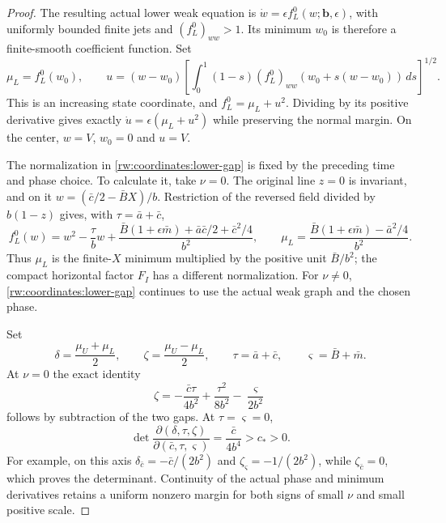 \begin{proof}
The resulting actual lower weak equation is
$\dot w=\epsilon f_L^0(w;\mathbf b,\epsilon)$, with uniformly
bounded finite jets and $(f_L^0)_{ww}>1$. Its minimum $w_0$ is
therefore a finite-smooth coefficient function. Set
\begin{equation}\label{rw:coordinates:lower-gap}
 \mu_L=f_L^0(w_0),\qquad
 u=(w-w_0)\left[\int_0^1(1-s)
    (f_L^0)_{ww}(w_0+s(w-w_0))\,ds\right]^{1/2}.
\end{equation}
This is an increasing state coordinate, and $f_L^0=\mu_L+u^2$.
Dividing by its positive derivative gives exactly
$\dot u=\epsilon(\mu_L+u^2)$ while preserving the normal margin.
On the center, $w=V$, $w_0=0$ and $u=V$.

The normalization in \eqref{rw:coordinates:lower-gap} is fixed by the
preceding time and phase choice. To calculate it, take $\nu=0$.
The original line $z=0$ is invariant, and on it
$w=(\bar c/2-\bar BX)/b$. Restriction of the reversed field divided
by $b(1-z)$ gives, with $\tau=\bar a+\bar c$,
\begin{equation}\label{rw:coordinates:lower-exact}
 f_L^0(w)=w^2-\frac{\tau}{b}w
  +\frac{\bar B(1+\epsilon\bar m)+\bar a\bar c/2+\bar c^2/4}{b^2},
 \qquad
 \mu_L=\frac{\bar B(1+\epsilon\bar m)-\bar a^2/4}{b^2}.
\end{equation}
Thus $\mu_L$ is the finite-$X$ minimum multiplied by the positive
unit $\bar B/b^2$; the compact horizontal factor $F_I$ has a
different normalization. For $\nu\ne0$,
\eqref{rw:coordinates:lower-gap} continues to use the actual weak
graph and the chosen phase.

Set
\begin{equation}\label{rw:coordinates:joint}
 \delta=\frac{\mu_U+\mu_L}{2},\qquad
 \zeta=\frac{\mu_U-\mu_L}{2},\qquad
 \tau=\bar a+\bar c,\qquad \varsigma=\bar B+\bar m.
\end{equation}
At $\nu=0$ the exact identity
\begin{equation}\label{rw:coordinates:zeta-identity}
 \zeta=-\frac{\bar c\tau}{4b^2}
          +\frac{\tau^2}{8b^2}-\frac{\varsigma}{2b^2}
\end{equation}
follows by subtraction of the two gaps. At $\tau=\varsigma=0$,
\begin{equation}\label{rw:coordinates:joint-jacobian}
 \det\frac{\partial(\delta,\tau,\zeta)}
                 {\partial(\bar c,\tau,\varsigma)}
       =\frac{\bar c}{4b^4}>c_*>0.
\end{equation}
For example, on this axis $\delta_{\bar c}=-\bar c/(2b^2)$ and
$\zeta_{\varsigma}=-1/(2b^2)$, while
$\zeta_{\bar c}=0$, which proves the determinant. Continuity of the
actual phase and minimum derivatives retains a uniform nonzero margin
for both signs of small $\nu$ and small positive scale.


\end{proof}
